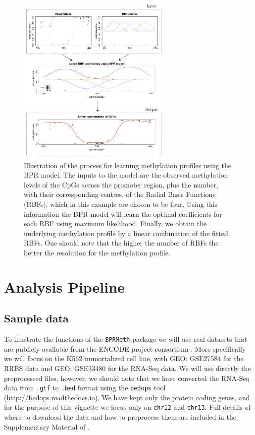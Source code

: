 \documentclass{article}\usepackage[]{graphicx}\usepackage[]{color}
\begin{document}
\begin{figure}[!ht]
\centerline{\includegraphics[width=0.66\textwidth]{model-bpr}}
\caption{\small{Illustration of the process for learning methylation profiles using the BPR model. The inputs to the model are the observed methylation levels of the CpGs across the promoter region, plus the number, with their corresponding centres, of the Radial Basis Functions (RBFs), which in this example are chosen to be four. Using this information the BPR model will learn the optimal coefficients for each RBF using maximum likelihood. Finally, we obtain the underlying methylation profile by a linear combination of the fitted RBFs. One should note that the higher the number of RBFs the better the resolution for the methylation profile.}}
\label{fig:model-performance}
\end{figure}


\section{Analysis Pipeline}

\subsection{Sample data}
To illustrate the functions of the \verb|BPRMeth| package we will use real datasets that are publicly available from the ENCODE project consortium \cite{Dunham2012}. More specifically we will focus on the K562 immortalized cell line, with GEO: GSE27584 for the RRBS data and GEO: GSE33480 for the RNA-Seq data. We will use directly the preprocessed files, however, we should note that we have converted the RNA-Seq data from \verb|.gtf| to \verb|.bed| format using the \verb|bedops| tool (\href{http://bedops.readthedocs.io} {http://bedops.readthedocs.io}). We have kept only the protein coding genes, and for the purpose of this vignette we focus only on \verb|chr12| and \verb|chr13|. Full details of where to download the data and how to preprocess them are included in the Supplementary Material of \cite{Kapourani2016}.
\end{document}
